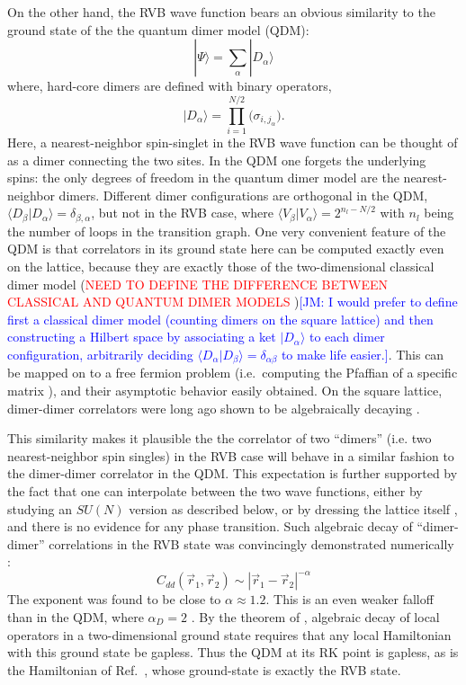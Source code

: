 \documentclass[11pt]{iopart}
\begin{document}
On the other hand, the RVB wave function bears an obvious similarity to the ground state of the
 the quantum dimer model (QDM)\cite{RokhsarKivelson}: 
 \begin{equation}
| \Psi \rangle = \sum_{\alpha} |D_{\alpha} \rangle
\end{equation}
where, hard-core dimers are defined with binary operators,
\begin{equation}
 |D_{\alpha} \rangle = \prod_{i=1}^{N/2} \big( \sigma_{i,j_{\alpha}}  \big).
 \end{equation}
 Here, a nearest-neighbor spin-singlet in the RVB wave function can be thought of as a dimer connecting the two sites. In the QDM one forgets the underlying spins: the only degrees of freedom in the quantum dimer model are the nearest-neighbor dimers. Different dimer configurations are orthogonal in the QDM, $\langle D_{\beta} | D_{\alpha} \rangle = \delta_{\beta,\alpha}$, but  not in the RVB case, where  $\langle V_{\beta} | V_{\alpha} \rangle = 2^{n_l - N/2}$ with $n_l$ being the number of loops in the transition graph. One very convenient feature of the QDM is that  correlators in its ground state here can be computed exactly even on the lattice, because they are exactly those of the two-dimensional classical dimer model (\textcolor{red}{NEED TO DEFINE THE DIFFERENCE BETWEEN CLASSICAL AND QUANTUM DIMER MODELS} )\textcolor{blue}{[JM: I would prefer to define first a classical dimer model (counting dimers on the square lattice) and then constructing a Hilbert space by associating a ket $|D_\alpha\rangle$ to 
each dimer configuration, arbitrarily deciding $\langle D_\alpha|D_{\beta}\rangle=\delta_{\alpha \beta}$ to make life easier.]}. This can be mapped on to a free fermion problem (i.e.\ computing the Pfaffian of a specific matrix \cite{Kasteleyn,Fisher}), and their asymptotic behavior easily obtained. On the square lattice, 
dimer-dimer correlators were long ago shown to be algebraically decaying \cite{FisherStephenson}.

This similarity makes it plausible the the correlator of two ``dimers'' (i.e. two nearest-neighbor spin singles) in the RVB case will behave in a similar fashion to the dimer-dimer correlator in the QDM. This expectation is further supported by the fact that one can interpolate between the two wave functions, either by studying an $SU(N)$ version as described below, or by dressing the lattice itself \cite{RMS}, and there is no evidence for any phase transition. Such algebraic decay of   ``dimer-dimer'' correlations  in the RVB state was convincingly demonstrated numerically
\cite{RVB1,RVB2}:
 \begin{equation}
  C_{dd}(\vec{r}_1,\vec{r}_2) \sim \left|\vec{r}_1-\vec{r}_2\right|^{-\alpha}
 \end{equation}
The exponent was found to be close to $\alpha \approx 1.2$. This is an even weaker falloff than in the QDM, where $\alpha_D=2$ \cite{FisherStephenson}. By the theorem of \cite{Hastings_thm}, algebraic decay of local operators in a two-dimensional ground state requires that any local Hamiltonian with this ground state be gapless. Thus the QDM at its RK point is gapless, as is the Hamiltonian of Ref.~\cite{Cano}, whose ground-state is exactly the RVB state. 
\end{document}
